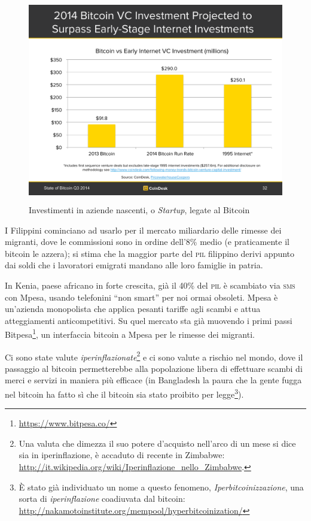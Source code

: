 \documentclass[a4paper,12pt,italian]{article}
\begin{document}
\begin{figure}
\centering
\includegraphics[width=15.649cm,height=8.954cm]{figures/vc.pdf}
\caption{Investimenti in aziende nascenti, o \emph{Startup}, legate al Bitcoin}
\end{figure}

\bigskip

I Filippini cominciano ad usarlo per il mercato miliardario delle
rimesse dei migranti, dove le commissioni sono in ordine dell’8\% medio
(e praticamente il bitcoin le azzera); si stima che la maggior parte
del \textsc{pil} filippino derivi appunto dai soldi che i lavoratori emigrati
mandano alle loro famiglie in patria.

\bigskip

In Kenia, paese africano in forte crescita, già il 40\% del \textsc{pil} è
scambiato via \textsc{sms} con Mpesa, usando telefonini “non smart” per noi
ormai obsoleti. Mpesa è un’azienda monopolista che applica pesanti
tariffe agli scambi e attua atteggiamenti anticompetitivi. Su quel
mercato sta già muovendo i primi passi
Bitpesa\footnote{\url{https://www.bitpesa.co/}}, un interfaccia bitcoin a
Mpesa per le rimesse dei migranti.


\bigskip

Ci sono state valute \emph{iperinflazionate}\footnote{Una valuta che dimezza
il suo potere d'acquisto nell'arco di un mese si dice sia in iperinflazione, è
accaduto di recente in Zimbabwe: \url{http://it.wikipedia.org/wiki/Iperinflazione_nello_Zimbabwe}.}
e ci sono valute a rischio nel mondo, dove il passaggio al bitcoin
permetterebbe alla popolazione libera di effettuare scambi di merci e
servizi in maniera più efficace (in Bangladesh la paura che la gente
fugga nel bitcoin ha fatto sì che il bitcoin sia stato proibito per
legge\footnote{È stato già individuato un nome a questo fenomeno, \emph{Iperbitcoinizzazione}, una sorta di \emph{iperinflazione}
coadiuvata dal bitcoin: \url{http://nakamotoinstitute.org/mempool/hyperbitcoinization/}}).
\end{document}
